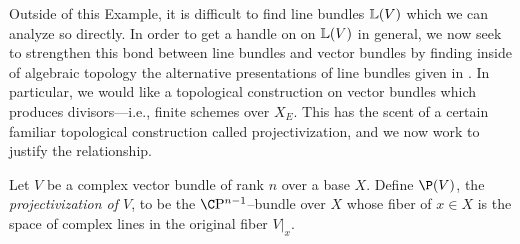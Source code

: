 Outside of this Example, it is difficult to find line bundles \(\mathbb{L}(V)\) which we can analyze so directly.  In order to get a handle on on \(\mathbb{L}(V)\) in general, we now seek to strengthen this bond between line bundles and vector bundles by finding inside of algebraic topology the alternative presentations of line bundles given in .  In particular, we would like a topological construction on vector bundles which produces divisors---i.e., finite schemes over \(X_E\).  This has the scent of a certain familiar topological construction called projectivization, and we now work to justify the relationship.

\begin{definition}
Let \(V\) be a complex vector bundle of rank \(n\) over a base \(X\).  Define \(\P(V)\), the \textit{projectivization of \(V\)}, to be the \(\CP^{n-1}\)--bundle over \(X\) whose fiber of \(x \in X\) is the space of complex lines in the original fiber \(V|_x\).
\end{definition}

